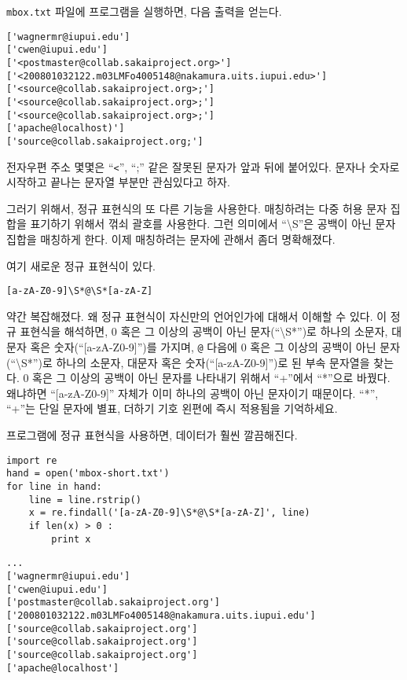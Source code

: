 {\tt mbox.txt} 파일에 프로그램을 실행하면, 다음 출력을 얻는다.

\beforeverb
\begin{verbatim}
['wagnermr@iupui.edu']
['cwen@iupui.edu']
['<postmaster@collab.sakaiproject.org>']
['<200801032122.m03LMFo4005148@nakamura.uits.iupui.edu>']
['<source@collab.sakaiproject.org>;']
['<source@collab.sakaiproject.org>;']
['<source@collab.sakaiproject.org>;']
['apache@localhost)']
['source@collab.sakaiproject.org;']
\end{verbatim}
\afterverb
%

전자우편 주소 몇몇은 ``\verb"<"'', ``;'' 같은 잘못된 문자가 앞과 뒤에 붙어있다.
문자나 숫자로 시작하고 끝나는 문자열 부분만 관심있다고 하자.

그러기 위해서, 정규 표현식의 또 다른 기능을 사용한다. 
매칭하려는 다중 허용 문자 집합을 표기하기 위해서 꺾쇠 괄호를 사용한다. 
그런 의미에서 ``{\textbackslash}S''은 공백이 아닌 문자 집합을 매칭하게 한다. 
이제 매칭하려는 문자에 관해서 좀더 명확해졌다.

여기 새로운 정규 표현식이 있다.

\beforeverb
\begin{verbatim}
[a-zA-Z0-9]\S*@\S*[a-zA-Z]
\end{verbatim}
\afterverb
%

약간 복잡해졌다. 왜 정규 표현식이 자신만의 언어인가에 대해서 이해할 수 있다. 
이 정규 표현식을 해석하면, 
0 혹은 그 이상의 공백이 아닌 문자(``{\textbackslash}S*'')로 하나의 소문자, 대문자 혹은 숫자(``[a-zA-Z0-9]'')를 가지며, {\verb"@"} 다음에 0 혹은 그 이상의 공백이 아닌 문자(``{\textbackslash}S*'')로 하나의 소문자, 대문자 혹은 숫자(``[a-zA-Z0-9]'')로 된 부속 문자열을 찾는다.
0 혹은 그 이상의 공백이 아닌 문자를 나타내기 위해서 ``+''에서 ``*''으로 바꿨다. 
왜냐하면 ``[a-zA-Z0-9]'' 자체가 이미 하나의 공백이 아닌 문자이기 때문이다.
``*'', ``+''는 단일 문자에 별표, 더하기 기호 왼편에 즉시 적용됨을 기억하세요.


프로그램에 정규 표현식을 사용하면, 데이터가 훨씬 깔끔해진다.

\beforeverb
\begin{verbatim}
import re
hand = open('mbox-short.txt')
for line in hand:
    line = line.rstrip()
    x = re.findall('[a-zA-Z0-9]\S*@\S*[a-zA-Z]', line)
    if len(x) > 0 :
        print x
\end{verbatim}
\afterverb
%

\beforeverb
\begin{verbatim}
...
['wagnermr@iupui.edu']
['cwen@iupui.edu']
['postmaster@collab.sakaiproject.org']
['200801032122.m03LMFo4005148@nakamura.uits.iupui.edu']
['source@collab.sakaiproject.org']
['source@collab.sakaiproject.org']
['source@collab.sakaiproject.org']
['apache@localhost']
\end{verbatim}
\afterverb
%

